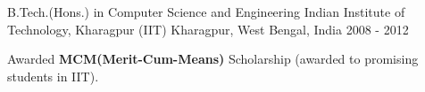 

\begin{cventries}

  \cventry
    {B.Tech.(Hons.) in Computer Science and Engineering} %
    {Indian Institute of Technology, Kharagpur (IIT)} %
    {Kharagpur, West Bengal, India} %
    {2008 - 2012} %
    {
      \begin{cvitems} %
        \item {Awarded \textbf{MCM(Merit-Cum-Means)} Scholarship (awarded to promising students in IIT).}
      \end{cvitems}
    }

\end{cventries}
